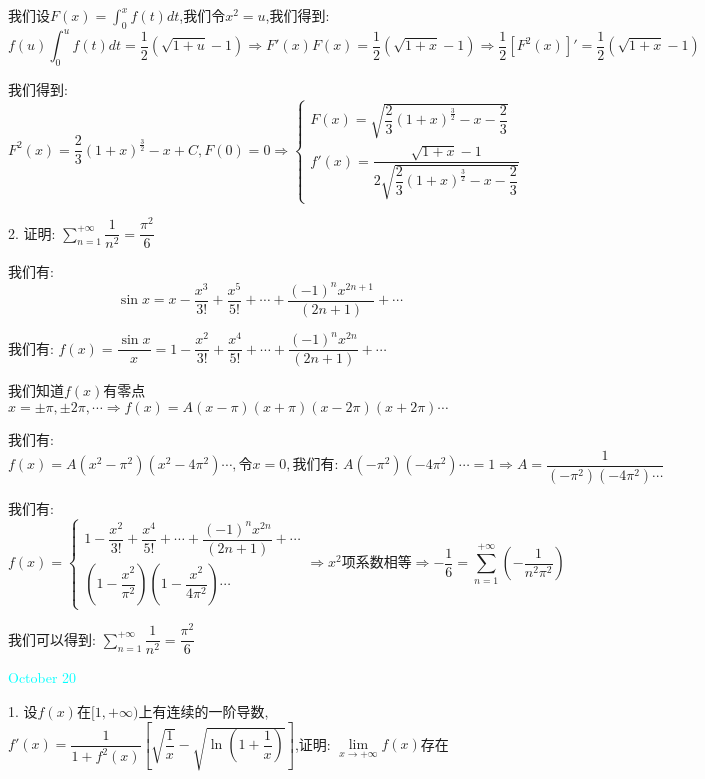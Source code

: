 \begin{solution}

	我们设$F(x)=\int_{0}^{x}f(t)dt$,我们令$x^2=u$,我们得到:  
	$$f(u)\int_{0}^{u}f(t)dt=\dfrac{1}{2}(\sqrt{1+u}-1)\Rightarrow F'(x)F(x)=\dfrac{1}{2}(\sqrt{1+x}-1)\Rightarrow \dfrac{1}{2}[F^2(x)]'=\dfrac{1}{2}(\sqrt{1+x}-1)$$
	
	我们得到:  
	$$F^2(x)=\dfrac{2}{3}(1+x)^{\frac{3}{2}}-x+C,F(0)=0\Rightarrow \left\lbrace
	\begin{array}{l}
		F(x)=\sqrt{\dfrac{2}{3}(1+x)^{\frac{3}{2}}-x-\dfrac{2}{3}}\\
		f'(x)=\dfrac{\sqrt{1+x}-1}{2\sqrt{\dfrac{2}{3}(1+x)^{\frac{3}{2}}-x-\dfrac{2}{3}}}
	\end{array}
	\right. $$
\end{solution}


2. 证明:  $\sum\limits_{n=1}^{+\infty}\dfrac{1}{n^2}=\dfrac{\pi^2}{6}$

\begin{solution}

	我们有:  
	$$\sin x=x-\dfrac{x^3}{3!}+\dfrac{x^5}{5!}+\cdots+\dfrac{(-1)^{n}x^{2n+1}}{(2n+1)}+\cdots$$
	
	我们有:  $f(x)=\dfrac{\sin x}{x}=1-\dfrac{x^2}{3!}+\dfrac{x^4}{5!}+\cdots+\dfrac{(-1)^{n}x^{2n}}{(2n+1)}+\cdots$
	
	我们知道$f(x)$有零点$x=\pm\pi,\pm 2\pi,\cdots\Rightarrow f(x)=A(x-\pi)(x+\pi)(x-2\pi)(x+2\pi)\cdots$
	
	
	我们有:  
	$$f(x)=A(x^2-\pi^2)(x^2-4\pi^2)\cdots,\text{令}x=0,\text{我们有:  }A(-\pi^2)(-4\pi^2)\cdots=1\Rightarrow A=\dfrac{1}{(-\pi^2)(-4\pi^2)\cdots}$$
	
	我们有:  $$f(x)=\left\lbrace
	\begin{array}{l}
		1-\dfrac{x^2}{3!}+\dfrac{x^4}{5!}+\cdots+\dfrac{(-1)^{n}x^{2n}}{(2n+1)}+\cdots\\
		(1-\dfrac{x^2}{\pi^2})(1-\dfrac{x^2}{4\pi^2})\cdots
	\end{array}
	\right. \Rightarrow x^2\text{项系数相等}\Rightarrow -\dfrac{1}{6}=\sum\limits_{n=1}^{+\infty}(-\dfrac{1}{n^2\pi^2})$$
	
	我们可以得到:  $\sum\limits_{n=1}^{+\infty}\dfrac{1}{n^2}=\dfrac{\pi^2}{6}$
\end{solution}


\textcolor{cyan}{October 20}

1. 设$f(x)$在$[1,+\infty)$上有连续的一阶导数,$f'(x)=\dfrac{1}{1+f^{2}(x)}\left[\sqrt{\dfrac{1}{x}}-\sqrt{\ln(1+\dfrac{1}{x})} \right] $,证明:  $\lim\limits_{x\to +\infty}f(x)$存在

